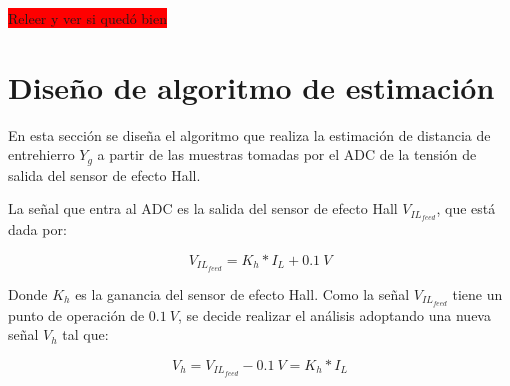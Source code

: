 \colorbox{red}{Releer y ver si quedó bien}

%
%
%
%
%



\section{Diseño de algoritmo de estimación}

En esta sección se diseña el algoritmo que realiza la estimación de distancia de entrehierro $Y_g$ a partir de las muestras tomadas por el ADC de la tensión de salida del sensor de efecto Hall.

La señal que entra al ADC es la salida del sensor de efecto Hall $V_{IL_{feed}}$, que está dada por:

\begin{equation*}
	V_{IL_{feed}}=K_h*I_L+0.1\:V
\end{equation*}

Donde $K_h$ es la ganancia del sensor de efecto Hall. Como la señal $V_{IL_{feed}}$ tiene un punto de operación de $0.1\:V$, se decide realizar el análisis adoptando una nueva señal $V_h$ tal que:

\begin{equation*}
	V_h=V_{IL_{feed}}-0.1\:V=K_h*I_L
\end{equation*}


